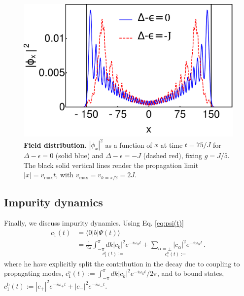 \documentclass[aps,pra,twocolumn,floatfix,superscriptaddress]{revtex4-1}%
\begin{document}
\begin{figure}[thb!]
\includegraphics[width=1.0\columnwidth]{wx_g_0_2_Delta_0_-1.pdf}
\caption{{\bf Field distribution.} $|\phi_x|^2$ as a function of $x$ at time $t=75/J$ for $\Delta-\epsilon=0$ (solid blue) and $\Delta-\epsilon=-J$ (dashed red), fixing $g=J/5$. The black solid vertical lines render the propagation limit $|x|=v_\text{max}t$, with $v_\text{max}=v_{k=\pi/2}=2J$.}\label{fig:w_n}
\end{figure}



\subsection{Impurity dynamics}

Finally, we discuss impurity dynamics. 
Using Eq. \eqref{eq:psi(t)}
\begin{align}
\label{eq:qubit_amplitude}
c_1(t) & =
\langle 0|b|\Psi(t)\rangle
\\ \nonumber
& =
\underset {c_1^\text{s}(t):=}{
\frac{1}{2\pi}\int_{-\pi}^\pi dk|c_k|^2 e^{-i\omega_k t}}  +
\underset {c_1^\text{b}(t):=}{
\sum_{\alpha = \pm}
 |c_\alpha|^2 e^{-i\omega_\alpha t}} \, .
\end{align}
where he have explicitly split  the contribution in the decay  due to coupling to propagating modes,  $c_1^\text{s}(t):=\int_{-\pi}^\pi dk |c_k|^2 e^{-i\omega_k t}/2\pi$, and  to  bound states, $c_1^\text{b}(t):=|c_+|^2 e^{-i\omega_+ t} + |c_-|^2 e^{-i\omega_- t}$.
\end{document}
